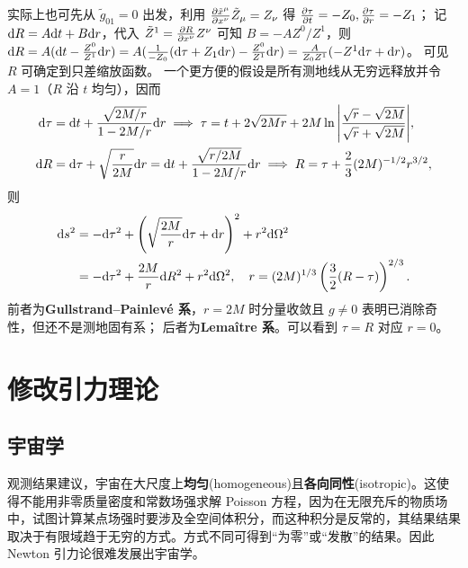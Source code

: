 实际上也可先从 $\tilde g_{01}=0$ 出发，利用 $\pdv{\tilde x^\mu}{x^\nu}\tilde Z_\mu=Z_\nu$ 得 $\pdv{\tau}{t}=-Z_0,\pdv{\tau}{r}=-Z_1$；
记 $\dd R=A\dd t+B\dd r$，代入 $\tilde Z^1=\pdv{R}{x^\nu}Z^\nu$ 可知 $B=-AZ^0/Z^1$，则 $\dd R=A(\dd t-\frac{Z^0}{Z^1}\dd r)=A(\frac{1}{-Z_0}(\dd\tau+Z_1\dd r)-\frac{Z^0}{Z^1}\dd r)=\frac{A}{Z_0Z^1}(-Z^1\dd\tau+\dd r)$。
可见 $R$ 可确定到只差缩放函数。
一个更方便的假设是所有测地线从无穷远释放并令 $A=1$（$R$ 沿 $t$ 均匀），因而
\begin{align}
    \dd\tau &= \dd t+\frac{\sqrt{2M/r}}{1-{2M}/{r}}\dd r\implies \tau = t+2 \sqrt{2Mr}+2M\ln\abs{\frac{\sqrt{r}-\sqrt{2M}}{\sqrt{r}+\sqrt{2M}}},\\
    \dd R &= \dd\tau+\sqrt{\frac{r}{2M}}\dd r = \dd t+\frac{\sqrt{r/2M}}{1-{2M}/{r}}\dd r\implies R=\tau+\frac 23(2M)^{-1/2}r^{3/2},
\end{align}
则
\begin{align}
    \dd s^2 &= -\dd\tau^2+\left(\sqrt{\frac{2M}{r}}\dd\tau+\dd r\right)^2+r^2\dd\Omega^2\\
    &= -\dd\tau^2+\frac{2M}{r}\dd R^2+r^2\dd\Omega^2,\quad r=(2M)^{1/3}\left(\frac 32(R-\tau)\right)^{2/3}.
\end{align}
前者为\textbf{Gullstrand–Painlevé 系}，$r=2M$ 时分量收敛且 $g\ne 0$ 表明已消除奇性，但还不是测地固有系； 
后者为\textbf{Lemaître 系}。可以看到 $\tau=R$ 对应 $r=0$。

\section{修改引力理论}
\subsection{宇宙学}
观测结果建议，宇宙在大尺度上\textbf{均匀}(homogeneous)且\textbf{各向同性}(isotropic)。这使得不能用非零质量密度和常数场强求解 Poisson 方程，因为在无限充斥的物质场中，试图计算某点场强时要涉及全空间体积分，而这种积分是反常的，其结果结果取决于有限域趋于无穷的方式。方式不同可得到“为零”或“发散”的结果。因此 Newton 引力论很难发展出宇宙学。

